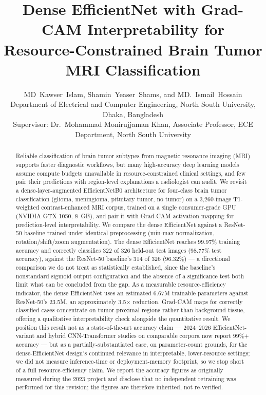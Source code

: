 \documentclass[journal]{IEEEtran}
\begin{document}
\title{Dense EfficientNet with Grad-CAM Interpretability for Resource-Constrained Brain Tumor MRI Classification}

\author{MD~Kawser~Islam, Shamin~Yeaser~Shams, and MD.~Ismail~Hossain\\
\small Department of Electrical and Computer Engineering, North South University, Dhaka, Bangladesh\\
\small Supervisor: Dr.\ Mohammad Monirujjaman Khan, Associate Professor, ECE Department, North South University}

\maketitle

\begin{abstract}
Reliable classification of brain tumor subtypes from magnetic resonance imaging (MRI) supports faster diagnostic workflows, but many high-accuracy deep learning models assume compute budgets unavailable in resource-constrained clinical settings, and few pair their predictions with region-level explanations a radiologist can audit. We revisit a dense-layer-augmented EfficientNetB0 architecture for four-class brain tumor classification (glioma, meningioma, pituitary tumor, no tumor) on a 3,260-image T1-weighted contrast-enhanced MRI corpus, trained on a single consumer-grade GPU (NVIDIA GTX 1050, 8~GB), and pair it with Grad-CAM activation mapping for prediction-level interpretability. We compare the dense EfficientNet against a ResNet-50 baseline trained under identical preprocessing (min-max normalization, rotation/shift/zoom augmentation). The dense EfficientNet reaches 99.97\% training accuracy and correctly classifies 322 of 326 held-out test images (98.77\% test accuracy), against the ResNet-50 baseline's 314 of 326 (96.32\%) --- a directional comparison we do not treat as statistically established, since the baseline's nonstandard sigmoid output configuration and the absence of a significance test both limit what can be concluded from the gap. As a measurable resource-efficiency indicator, the dense EfficientNet uses an estimated 6.67M trainable parameters against ResNet-50's 23.5M, an approximately 3.5$\times$ reduction. Grad-CAM maps for correctly classified cases concentrate on tumor-proximal regions rather than background tissue, offering a qualitative interpretability check alongside the quantitative result. We position this result not as a state-of-the-art accuracy claim --- 2024--2026 EfficientNet-variant and hybrid CNN-Transformer studies on comparable corpora now report 99\%+ accuracy --- but as a partially-substantiated case, on parameter-count grounds, for the dense-EfficientNet design's continued relevance in interpretable, lower-resource settings; we did not measure inference-time or deployment-memory footprint, so we stop short of a full resource-efficiency claim. We report the accuracy figures as originally measured during the 2023 project and disclose that no independent retraining was performed for this revision; the figures are therefore inherited, not re-verified.
\end{abstract}
\end{document}
